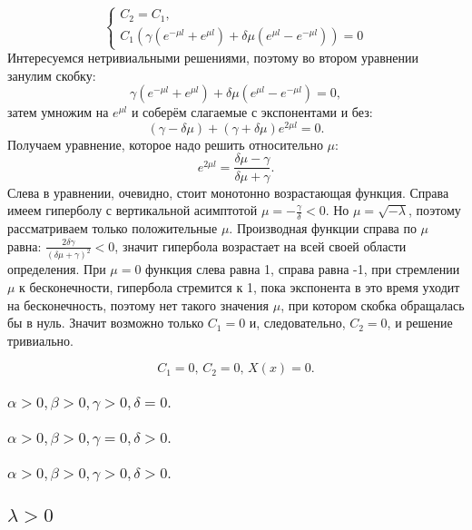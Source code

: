 \documentclass[12pt, a4paper]{article}
\begin{document}
\begin{equation}
	\begin{cases}
		C_{2} = C_{1}, \\
		C_{1} (\gamma (e^{-\mu l} + e^{\mu l}) + \delta \mu (e^{\mu l} - e^{-\mu l})) = 0
	\end{cases}
\end{equation}
Интересуемся нетривиальными решениями, поэтому во втором уравнении занулим скобку:
\[ \gamma (e^{-\mu l} + e^{\mu l}) + \delta \mu (e^{\mu l} - e^{-\mu l}) = 0, \]
затем умножим на $ e^{\mu l}$ и соберём слагаемые с экспонентами и без:
\[ (\gamma - \delta \mu) + (\gamma + \delta \mu) e^{2 \mu l} = 0. \]
Получаем уравнение, которое надо решить относительно $\mu$:
\[ e^{2 \mu l} = \frac{\delta \mu - \gamma}{\delta \mu + \gamma}. \]
Слева в уравнении, очевидно, стоит монотонно возрастающая функция. Справа имеем гиперболу с вертикальной асимптотой $\mu = -\frac{\gamma}{\delta} < 0$. Но $\mu = \sqrt{-\lambda}$, поэтому рассматриваем только положительные $\mu$. Производная функции справа по $\mu$ равна: $\frac{2\delta \gamma}{(\delta \mu + \gamma)^2} < 0$, значит гипербола возрастает на всей своей области определения. При $\mu = 0$ функция слева равна 1, справа равна -1, при стремлении $\mu$ к бесконечности, гипербола стремится к 1, пока экспонента в это время уходит на бесконечность, поэтому нет такого значения $\mu$, при котором скобка обращалась бы в нуль. Значит возможно только $C_{1} = 0$ и, следовательно, $C_{2} = 0$, и решение тривиально.

\[ C_{1} = 0, \, C_{2} = 0, \, X(x) = 0. \]

\subsubsection{ $ \alpha > 0, \beta > 0, \gamma > 0, \delta = 0. $}
\subsubsection{ $ \alpha > 0, \beta > 0, \gamma = 0, \delta > 0. $}
\subsubsection{ $ \alpha > 0, \beta > 0, \gamma > 0, \delta > 0. $}

\subsection{$\lambda > 0$}
\end{document}
